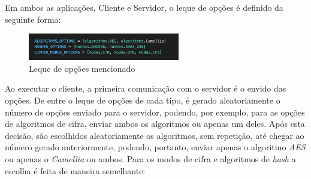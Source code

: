 \documentclass[10pt,english]{article}
\begin{document}
 \par Em ambos as aplicações, Cliente e Servidor, o leque de opções é definido da seguinte forma:
 
  \begin{figure}[!h]
        \centering
        \includegraphics[width=250]{images/cipher_suite.png}
        \caption{Leque de opções mencionado}
    \end{figure}
 
 \par Ao executar o cliente, a primeira comunicação com o servidor é o envido das opções. De entre o leque de opções de cada tipo, é gerado aleatoriamente o número de opções enviado para o servidor, podendo, por exemplo, para as opções de algoritmos de cifra, enviar ambos os algoritmos ou apenas um deles. Após esta decisão, são escolhidos aleatoriamente os algoritmos, sem repetição, até chegar ao número gerado anteriormente, podendo, portanto, enviar apenas o algoritmo \textit{AES} ou apenas o \textit{Camellia} ou ambos. Para os modos de cifra e algoritmos de \textit{hash} a escolha é feita de maneira semelhante: 
\end{document}
